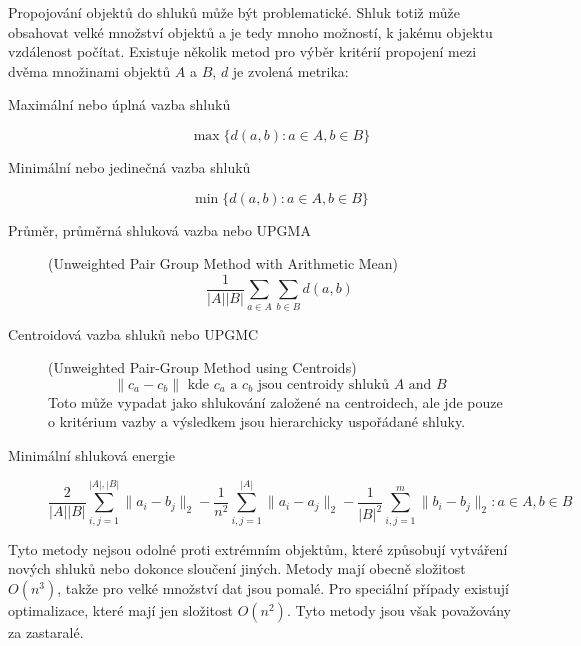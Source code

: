 \begin{description}
Propojování objektů do shluků může být problematické. Shluk totiž může obsahovat velké množství objektů a je tedy mnoho možností, k jakému objektu vzdálenost počítat. Existuje několik metod pro výběr kritérií propojení mezi dvěma množinami objektů $A$ a $B$, $d$ je zvolená metrika:
\begin{description}
\item[Maximální nebo úplná vazba shluků] $$\max\{d(a,b) : a \in A, b \in B\}$$
\item[Minimální nebo jedinečná vazba shluků] $$\min\{d(a,b) : a \in A, b \in B\}$$
\item[Průměr, průměrná shluková vazba nebo UPGMA] (Unweighted Pair Group Method with Arithmetic Mean) $$\frac{1}{|A||B|}\sum_{a \in A} \sum_{b \in B} d(a,b)$$
\item[Centroidová vazba shluků nebo UPGMC] (Unweighted Pair-Group Method using Centroids) $$\|c_a - c_b\| \mbox{ kde } c_a \mbox{ a } c_b \mbox{ jsou centroidy shluků } A \mbox{ and } B$$
Toto může vypadat jako shlukování založené na centroidech, ale jde pouze o kritérium vazby a výsledkem jsou hierarchicky uspořádané shluky.
\item[Minimální shluková energie] $$\frac{2}{|A||B|}\sum_{i,j=1}^{|A|,|B|}\|a_i-b_j\|_2-\frac{1}{n^2}\sum_{i,j=1}^{|A|}\|a_i-a_j\|_2-\frac{1}{|B|^2}\sum_{i,j=1}^{m}\|b_{i}-b_{j}\|_{2} : a \in A, b \in B$$
\end{description}

Tyto metody nejsou odolné proti extrémním objektům, které způsobují vytváření nových shluků nebo dokonce sloučení jiných. Metody mají obecně složitost $O(n^3) $, takže pro velké množství dat jsou pomalé. Pro speciální případy existují optimalizace, které mají jen složitost $O(n^2) $. Tyto metody jsou však považovány za zastaralé.


\end{description}
